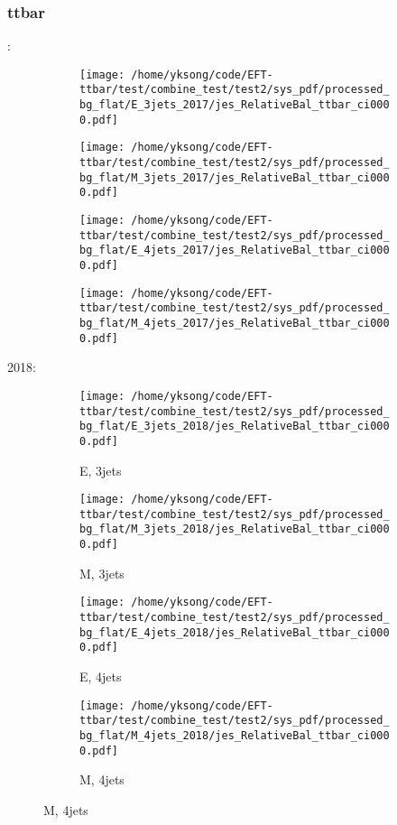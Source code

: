 \documentclass{beamer}
\begin{document}
\begin{frame}
\frametitle{ttbar}
\fontsize{5}{1}:
\begin{figure}
\centering
\begin{subfigure}[b]{0.24\textwidth}
\texttt{[image: /home/yksong/code/EFT-ttbar/test/combine\_test/test2/sys\_pdf/processed\_bg\_flat/E\_3jets\_2017/jes\_RelativeBal\_ttbar\_ci0000.pdf]}
\end{subfigure}
\begin{subfigure}[b]{0.24\textwidth}
\texttt{[image: /home/yksong/code/EFT-ttbar/test/combine\_test/test2/sys\_pdf/processed\_bg\_flat/M\_3jets\_2017/jes\_RelativeBal\_ttbar\_ci0000.pdf]}
\end{subfigure}
\begin{subfigure}[b]{0.24\textwidth}
\texttt{[image: /home/yksong/code/EFT-ttbar/test/combine\_test/test2/sys\_pdf/processed\_bg\_flat/E\_4jets\_2017/jes\_RelativeBal\_ttbar\_ci0000.pdf]}
\end{subfigure}
\begin{subfigure}[b]{0.24\textwidth}
\texttt{[image: /home/yksong/code/EFT-ttbar/test/combine\_test/test2/sys\_pdf/processed\_bg\_flat/M\_4jets\_2017/jes\_RelativeBal\_ttbar\_ci0000.pdf]}
\end{subfigure}
\end{figure}
2018:
\begin{figure}
\centering
\begin{subfigure}[b]{0.24\textwidth}
\texttt{[image: /home/yksong/code/EFT-ttbar/test/combine\_test/test2/sys\_pdf/processed\_bg\_flat/E\_3jets\_2018/jes\_RelativeBal\_ttbar\_ci0000.pdf]}
\captionsetup{font=tiny}
\caption{E, 3jets}
\end{subfigure}
\begin{subfigure}[b]{0.24\textwidth}
\texttt{[image: /home/yksong/code/EFT-ttbar/test/combine\_test/test2/sys\_pdf/processed\_bg\_flat/M\_3jets\_2018/jes\_RelativeBal\_ttbar\_ci0000.pdf]}
\captionsetup{font=tiny}
\caption{M, 3jets}
\end{subfigure}
\begin{subfigure}[b]{0.24\textwidth}
\texttt{[image: /home/yksong/code/EFT-ttbar/test/combine\_test/test2/sys\_pdf/processed\_bg\_flat/E\_4jets\_2018/jes\_RelativeBal\_ttbar\_ci0000.pdf]}
\captionsetup{font=tiny}
\caption{E, 4jets}
\end{subfigure}
\begin{subfigure}[b]{0.24\textwidth}
\texttt{[image: /home/yksong/code/EFT-ttbar/test/combine\_test/test2/sys\_pdf/processed\_bg\_flat/M\_4jets\_2018/jes\_RelativeBal\_ttbar\_ci0000.pdf]}
\captionsetup{font=tiny}
\caption{M, 4jets}
\end{subfigure}
\end{figure}
\end{frame}
\end{document}
